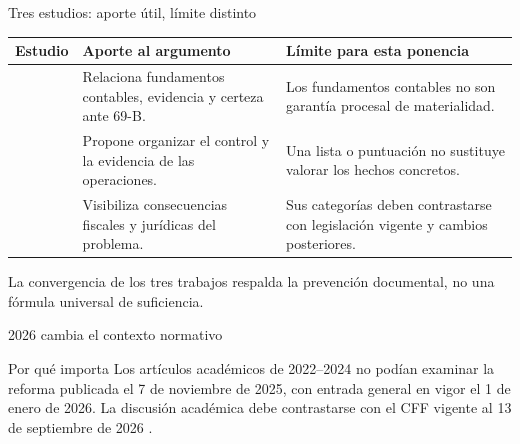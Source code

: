 \documentclass[spanish,aspectratio=169,xcolor={dvipsnames,table}]{beamer}
\begin{document}
\begin{frame}{Tres estudios: aporte útil, límite distinto}
  \begin{tabularx}{\linewidth}{@{}p{.22\linewidth}Y Y@{}}
    \toprule
    \textbf{Estudio} & \textbf{Aporte al argumento} & \textbf{Límite para esta ponencia}\\
    \midrule
    \textcite{arrona2022certeza} & Relaciona fundamentos contables, evidencia y certeza ante 69-B. & Los fundamentos contables no son garantía procesal de materialidad.\\
    \textcite{rico2023mecanismo} & Propone organizar el control y la evidencia de las operaciones. & Una lista o puntuación no sustituye valorar los hechos concretos.\\
    \textcite{rico2024consecuencias} & Visibiliza consecuencias fiscales y jurídicas del problema. & Sus categorías deben contrastarse con legislación vigente y cambios posteriores.\\
    \bottomrule
  \end{tabularx}
  \vfill\centering\small La convergencia de los tres trabajos respalda la prevención documental, no una fórmula universal de suficiencia.
\end{frame}

\begin{frame}{2026 cambia el contexto normativo}
  \begin{center}
  \end{center}
  \vfill
  \begin{block}{Por qué importa}
    Los artículos académicos de 2022--2024 no podían examinar la reforma publicada el 7 de noviembre de 2025, con entrada general en vigor el 1 de enero de 2026. La discusión académica debe contrastarse con el CFF vigente al 13 de septiembre de 2026 \parencite{cff2026}.
  \end{block}
\end{frame}
\end{document}
